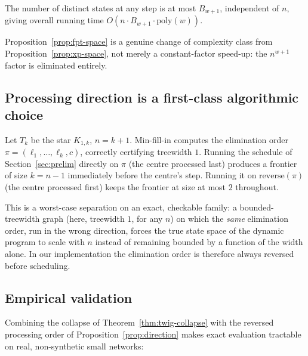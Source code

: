 \documentclass[ijoc,sglanonrev]{informs4}
\begin{document}
\begin{proposition}\label{prop:fpt-space}
The number of distinct states at any step is at most $B_{w+1}$, independent
of $n$, giving overall running time $O(n\cdot B_{w+1}\cdot\mathrm{poly}(w))$.
\end{proposition}

Proposition~\ref{prop:fpt-space} is a genuine change of complexity class
from Proposition~\ref{prop:xp-space}, not merely a constant-factor speed-up:
the $n^{w+1}$ factor is eliminated entirely.

\subsection{Processing direction is a first-class algorithmic choice}\label{sec:twig-direction}

\begin{proposition}\label{prop:direction}
Let $T_k$ be the star $K_{1,k}$, $n=k+1$. Min-fill-in computes the
elimination order $\pi=(\ell_1,\dots,\ell_k,c)$, correctly certifying
treewidth $1$. Running the schedule of Section~\ref{sec:prelim} directly on
$\pi$ (the centre processed last) produces a frontier of size $k=n-1$
immediately before the centre's step. Running it on $\mathrm{reverse}(\pi)$
(the centre processed first) keeps the frontier at size at most $2$
throughout.
\end{proposition}

This is a worst-case separation on an exact, checkable family: a
bounded-treewidth graph (here, treewidth $1$, for any $n$) on which the
\emph{same} elimination order, run in the wrong direction, forces the true
state space of the dynamic program to scale with $n$ instead of remaining
bounded by a function of the width alone. In our implementation the
elimination order is therefore always reversed before scheduling.

\subsection{Empirical validation}\label{sec:twig-empirical}

Combining the collapse of Theorem~\ref{thm:twig-collapse} with the reversed
processing order of Proposition~\ref{prop:direction} makes exact evaluation
tractable on real, non-synthetic small networks:
\end{document}

